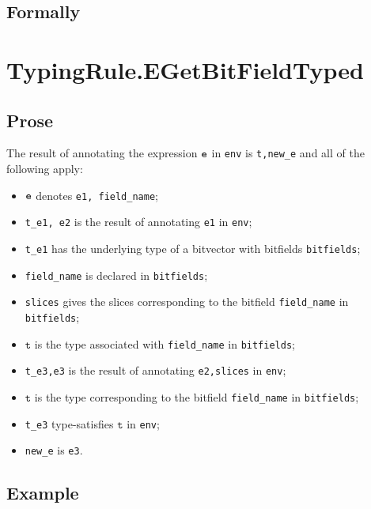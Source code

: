 \documentclass{book}
\newcommand\vt[0]{\texttt{t}}
\begin{document}
\begin{itemize}
\begin{emptyformal}
    \subsection{Formally}
\end{emptyformal}


\section{TypingRule.EGetBitFieldTyped \label{sec:TypingRule.EGetBitFieldTyped}}

  \subsection{Prose}
  The result of annotating the expression $\texttt{e}$ in \texttt{env} is
\texttt{t,new\_e} and all of the following apply:
  \begin{itemize}
  \item $\texttt{e}$ denotes \texttt{e1, field\_name};
  \item \texttt{t\_e1, e2} is the result of annotating \texttt{e1} in \texttt{env};
  \item \texttt{t\_e1} has the underlying type of a bitvector with bitfields \texttt{bitfields};
  \item \texttt{field\_name} is declared in \texttt{bitfields};
  \item \texttt{slices} gives the slices corresponding to the bitfield \texttt{field\_name} in \\
    \texttt{bitfields};
  \item $\vt$ is the type associated with \texttt{field\_name} in \texttt{bitfields};
  \item \texttt{t\_e3,e3} is the result of annotating \texttt{e2,slices} in \texttt{env};
  \item $\vt$ is the type corresponding to the bitfield \texttt{field\_name} in \texttt{bitfields};
  \item \texttt{t\_e3} type-satisfies $\vt$ in \texttt{env};
  \item \texttt{new\_e} is \texttt{e3}.
  \end{itemize}

  \subsection{Example}



\end{itemize}
\end{document}

